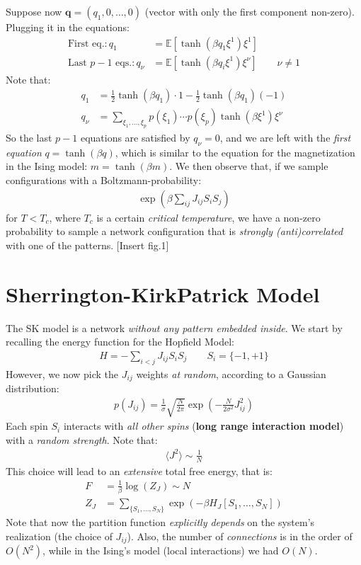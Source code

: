\documentclass[../template.tex]{subfiles}
\begin{document}
Suppose now $\bm{q} = (q_1, 0,\dots,0)$ (vector with only the first component non-zero). Plugging it in the equations:
\begin{align*}
    \text{First eq.}\colon q_1 &= \mathbb{E}[\tanh(\beta q_1 \xi^1) \xi^1]\\
    \text{Last $p-1$ eqs.}\colon q_\nu &= \mathbb{E}[\tanh (\beta q_i \xi^1)\xi^\nu] \qquad \nu \neq 1
\end{align*} 
Note that:
\begin{align*}
    q_1 &= \frac{1}{2}\tanh (\beta q_1) \cdot 1 - \frac{1}{2} \tanh(\beta q_1)(-1)  \\
    q_\nu &= \sum_{\xi_1, \dots, \xi_p} p(\xi_1)\cdots p(\xi_p) \tanh(\beta \xi^1) \xi^\nu  
\end{align*}
So the last $p-1$ equations are satisfied by $q_\nu = 0$, and we are left with the \textit{first equation} $q=\tanh(\beta q)$, which is similar to the equation for the magnetization in the Ising model: $m = \tanh(\beta m)$. We then observe that, if we sample configurations with a Boltzmann-probability:
\begin{align*}
    \exp(\beta \sum_{ij} J_{ij} S_i S_j)
\end{align*}
for $T < T_c$, where $T_c$ is a certain \textit{critical temperature}, we have a non-zero probability to sample a network configuration that is \textit{strongly (anti)correlated} with one of the patterns. 
[Insert fig.1]

\section{Sherrington-KirkPatrick Model}
The SK model is a network \textit{without any pattern embedded inside}. We start by recalling the energy function for the Hopfield Model:
\begin{align*}
    H = -\sum_{i < j} J_{ij} S_i S_j \qquad S_i = \{-1,+1\}
\end{align*} 
However, we now pick the $J_{ij}$ weights \textit{at random}, according to a Gaussian distribution:
\begin{align*}
    p(J_{ij}) = \frac{1}{\sigma} \sqrt{\frac{N}{2\pi} }  \exp\left(-\frac{N}{2 \sigma^2} J_{ij}^2 \right)
\end{align*}  
Each spin $S_i$ interacts with \textit{all other spins} (\textbf{long range interaction model}) with a \textit{random strength}. Note that:
\begin{align*}
    \langle J^2 \rangle \sim \frac{1}{N} 
\end{align*}   
This choice will lead to an \textit{extensive}  total free energy, that is:
\begin{align*}
    F &= \frac{1}{\beta} \log (Z_J) \sim N\\
    Z_J &= \sum_{\{S_1,\dots, S_N\}} \exp\left(-\beta H_J[S_1, \dots, S_N]\right)
\end{align*}
Note that now the partition function \textit{explicitly depends} on the system's realization (the choice of $J_{ij}$). Also, the number of \textit{connections} is in the order of $O(N^2)$, while in the Ising's model (local interactions) we had $O(N)$.\\
\end{document}
